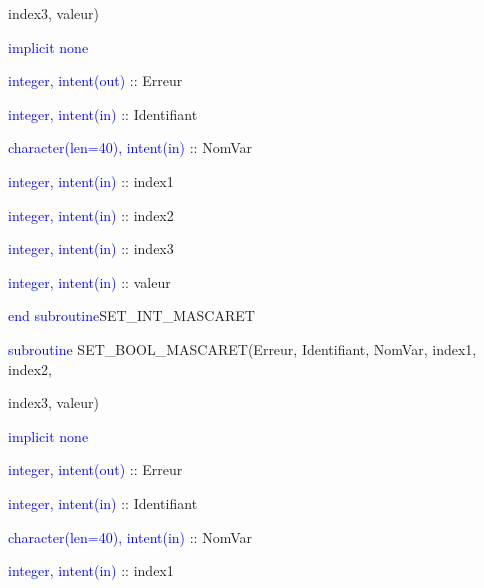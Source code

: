 \documentclass[a4paper,11pt]{article}
\begin{document}
     index3, valeur)
    
        \hspace{1cm}\textcolor{blue}{implicit none}                 
        
        \hspace{1cm} \textcolor{blue}{integer, intent(out)} :: Erreur
        
        \hspace{1cm} \textcolor{blue}{integer, intent(in)}  :: Identifiant
        
        \hspace{1cm} \textcolor{blue}{character(len=40), intent(in)}  :: NomVar
        
        \hspace{1cm} \textcolor{blue}{integer, intent(in)}  :: index1
        
        \hspace{1cm} \textcolor{blue}{integer, intent(in)}  :: index2
        
        \hspace{1cm} \textcolor{blue}{integer, intent(in)}  :: index3
        
        \hspace{1cm} \textcolor{blue}{integer, intent(in)}  :: valeur
        
    \textcolor{blue}{end subroutine}SET\_INT\_MASCARET

 \vspace{0.5cm}
 
 \vspace{0.5cm}
 
    \textcolor{blue}{subroutine} SET\_BOOL\_MASCARET(Erreur, Identifiant, NomVar, index1, index2,
    
     index3, valeur)
    
        \hspace{1cm}\textcolor{blue}{implicit none}                 
        
        \hspace{1cm} \textcolor{blue}{integer, intent(out)} :: Erreur
        
        \hspace{1cm} \textcolor{blue}{integer, intent(in)}  :: Identifiant
        
        \hspace{1cm} \textcolor{blue}{character(len=40), intent(in)}  :: NomVar
        
        \hspace{1cm} \textcolor{blue}{integer, intent(in)}  :: index1
        
\end{document}

